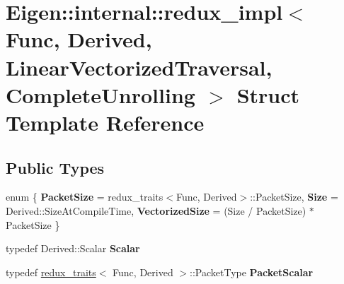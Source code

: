 \hypertarget{struct_eigen_1_1internal_1_1redux__impl_3_01_func_00_01_derived_00_01_linear_vectorized_traversal_00_01_complete_unrolling_01_4}{}\section{Eigen\+::internal\+::redux\+\_\+impl$<$ Func, Derived, Linear\+Vectorized\+Traversal, Complete\+Unrolling $>$ Struct Template Reference}
\label{struct_eigen_1_1internal_1_1redux__impl_3_01_func_00_01_derived_00_01_linear_vectorized_traversal_00_01_complete_unrolling_01_4}
\subsection*{Public Types}
\begin{DoxyCompactItemize}
\item 
\mbox{\label{struct_eigen_1_1internal_1_1redux__impl_3_01_func_00_01_derived_00_01_linear_vectorized_traversal_00_01_complete_unrolling_01_4_a9337f61bbe341e41fc46e33eda4a18e6}} 
enum \{ {\bfseries Packet\+Size} = redux\+\_\+traits$<$Func, Derived$>$\+::Packet\+Size, 
{\bfseries Size} = Derived\+::Size\+At\+Compile\+Time, 
{\bfseries Vectorized\+Size} = (Size / Packet\+Size) $\ast$ Packet\+Size
 \}
\item 
\mbox{\label{struct_eigen_1_1internal_1_1redux__impl_3_01_func_00_01_derived_00_01_linear_vectorized_traversal_00_01_complete_unrolling_01_4_a92554573500a786e71a86a21b53cc775}} 
typedef Derived\+::\+Scalar {\bfseries Scalar}
\item 
\mbox{\label{struct_eigen_1_1internal_1_1redux__impl_3_01_func_00_01_derived_00_01_linear_vectorized_traversal_00_01_complete_unrolling_01_4_a45c80e6975a1cc49f74f7dc5e11ff837}} 
typedef \mbox{\hyperlink{struct_eigen_1_1internal_1_1redux__traits}{redux\+\_\+traits}}$<$ Func, Derived $>$\+::Packet\+Type {\bfseries Packet\+Scalar}
\end{DoxyCompactItemize}
